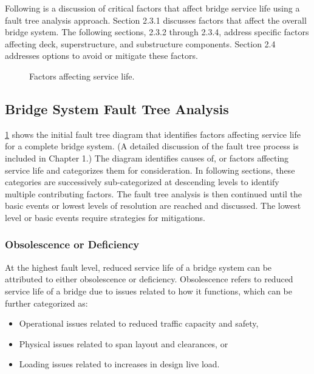 Following is a discussion of critical factors that affect bridge service life using a fault tree analysis approach. Section 2.3.1 discusses factors that affect the overall bridge system. The following sections, 2.3.2 through 2.3.4, address specific factors affecting deck, superstructure, and substructure components. Section 2.4 addresses options to avoid or mitigate these factors.

\begin{figure}
  \caption{Factors affecting service life.}\label{fig:factor-service-life}
\end{figure}

\subsection{Bridge System Fault Tree Analysis}

\cref{fig:factor-service-life} shows the initial fault tree diagram that identifies factors affecting service life for a complete bridge system. (A detailed discussion of the fault tree process is included in Chapter 1.) The diagram identifies causes of, or factors affecting service life and categorizes them for consideration. In following sections, these categories are successively sub-categorized at descending levels to identify multiple contributing factors. The fault tree analysis is then continued until the basic events or lowest levels of resolution are reached and discussed. The lowest level or basic events require strategies for mitigations.

\subsubsection{Obsolescence or Deficiency}

At the highest fault level, reduced service life of a bridge system can be attributed to either obsolescence or deficiency. Obsolescence refers to reduced service life of a bridge due to issues related to how it functions, which can be further categorized as:
\begin{itemize}
  \item Operational issues related to reduced traffic capacity and safety,
  \item Physical issues related to span layout and clearances, or
  \item Loading issues related to increases in design live load.
\end{itemize}

